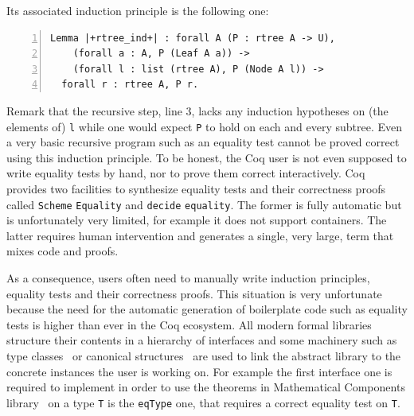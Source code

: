 \documentclass[sigplan,10pt,review]{acmart}\settopmatter{printfolios=true,printccs=false,printacmref=false}
\begin{document}
\noindent
Its associated induction principle is the following one:

\begin{minipage}{\textwidth}\begin{lstlisting}[numbers=left]
Lemma |+rtree_ind+| : forall A (P : rtree A -> U),
    (forall a : A, P (Leaf A a)) ->
    (forall l : list (rtree A), P (Node A l)) ->
  forall r : rtree A, P r.
\end{lstlisting}\end{minipage}

Remark that the recursive step, line 3, lacks any induction hypotheses
on (the elements of) \lstinline+l+ while one would expect
\lstinline+P+ to hold on each and every subtree. Even a very basic
recursive program such as an equality test cannot be proved correct
using this induction principle.
To be honest, the Coq
user is not even supposed to write equality tests by hand, nor to prove
them correct interactively.  Coq provides two facilities to synthesize
equality tests and their correctness proofs called 
\lstinline+Scheme+ \lstinline+Equality+ and
\lstinline+decide+ \lstinline+equality+. 
The former is fully
automatic but is unfortunately very limited, for example it does not support
containers.  The latter requires human intervention 
and generates a single, very large, term that mixes code and proofs.

As a consequence, %
users often need to manually write induction principles,
equality tests and their correctness proofs.
This situation is very unfortunate because the need for the automatic
generation of boilerplate code such as equality tests
is higher than ever in the Coq ecosystem.
All modern formal libraries structure their contents in a
hierarchy of interfaces and some machinery such as type
classes~\cite{Sozeau:2008:FTC:1459784.1459810} or
canonical structures~\cite{10.1007/978-3-642-39634-2_5}
are used to link the abstract library to the
concrete instances the user is working on.
For example the first interface one
is required to implement in order to use the theorems in Mathematical
Components library~\cite{mcb} on a type \lstinline+T+ is the \lstinline+eqType+
one, that requires a correct equality test on \lstinline+T+.

\end{document}
